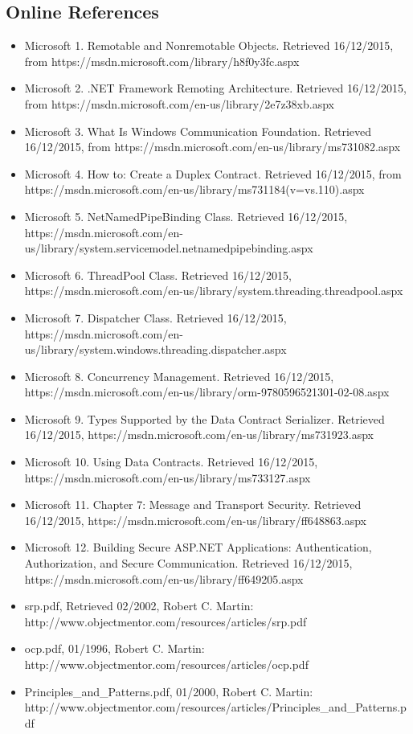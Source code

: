 \subsection {Online References}
\begin{itemize}
	\item Microsoft 1. Remotable and Nonremotable Objects. Retrieved 16/12/2015, from https://msdn.microsoft.com/library/h8f0y3fc.aspx
	\item Microsoft 2. .NET Framework Remoting Architecture. Retrieved 16/12/2015, from https://msdn.microsoft.com/en-us/library/2e7z38xb.aspx
	\item Microsoft 3. What Is Windows Communication Foundation. Retrieved 16/12/2015, from https://msdn.microsoft.com/en-us/library/ms731082.aspx
	\item Microsoft 4. How to: Create a Duplex Contract. Retrieved 16/12/2015, from https://msdn.microsoft.com/en-us/library/ms731184(v=vs.110).aspx
	\item Microsoft 5. NetNamedPipeBinding Class. Retrieved 16/12/2015, https://msdn.microsoft.com/en-us/library/system.servicemodel.netnamedpipebinding.aspx
	\item Microsoft 6. ThreadPool Class. Retrieved 16/12/2015, https://msdn.microsoft.com/en-us/library/system.threading.threadpool.aspx
	\item Microsoft 7. Dispatcher Class. Retrieved 16/12/2015, https://msdn.microsoft.com/en-us/library/system.windows.threading.dispatcher.aspx
	\item Microsoft 8. Concurrency Management. Retrieved 16/12/2015, https://msdn.microsoft.com/en-us/library/orm-9780596521301-02-08.aspx
	\item Microsoft 9. Types Supported by the Data Contract Serializer. Retrieved 16/12/2015, https://msdn.microsoft.com/en-us/library/ms731923.aspx
	\item Microsoft 10. Using Data Contracts. Retrieved 16/12/2015, https://msdn.microsoft.com/en-us/library/ms733127.aspx
	\item Microsoft 11. Chapter 7: Message and Transport Security. Retrieved 16/12/2015, https://msdn.microsoft.com/en-us/library/ff648863.aspx
	\item Microsoft 12. Building Secure ASP.NET Applications: Authentication, Authorization, and Secure Communication. Retrieved 16/12/2015, https://msdn.microsoft.com/en-us/library/ff649205.aspx
 	\item srp.pdf, Retrieved 02/2002, Robert C. Martin:   http://www.objectmentor.com/resources/articles/srp.pdf
 	\item ocp.pdf, 01/1996, Robert C. Martin:   http://www.objectmentor.com/resources/articles/ocp.pdf
 	\item Principles\_and\_Patterns.pdf, 01/2000, Robert C. Martin: http://www.objectmentor.com/resources/articles/Principles\_and\_Patterns.pdf
\end{itemize}
